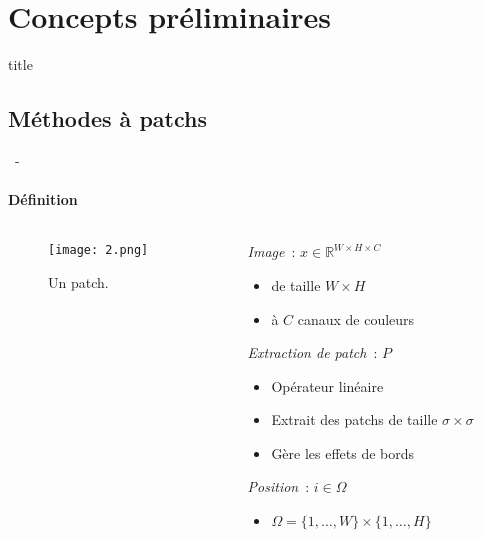 \documentclass[aspectratio=169, 22pt]{beamer}
\begin{document}
\section{Concepts préliminaires}
\begin{frame}
  \begin{beamercolorbox}[sep=15pt,center,shadow=true,rounded=true]{title}
    \LARGE\bfseries \secname
  \end{beamercolorbox}
\end{frame}

\subsection{Méthodes à patchs}
\begin{frame}{\secname~- \subsecname}
  \framesubtitle{Définition}
  \begin{columns}
    \begin{column}{0.45\linewidth}
      \begin{figure}
        \centering
        \texttt{[image: 2.png]}
        \caption{Un patch.}
      \end{figure}
    \end{column}
    
    \begin{column}{0.55\linewidth}
      \emph{Image} : $x \in \mathbb{R}^{W \times H \times C}$
      \begin{itemize}
        \footnotesize 
      \item de taille $W \times H$
      \item à $C$ canaux de couleurs
      \end{itemize}
      
      \vfill
      \emph{Extraction de patch} : $P$
      \begin{itemize}
        \footnotesize 
      \item Opérateur linéaire
      \item Extrait des patchs de taille $\sigma \times \sigma$
      \item Gère les effets de bords
      \end{itemize}

      \vfill
      \emph{Position} : $i \in \Omega$
      \begin{itemize}
        \footnotesize 
      \item $\Omega = \{1,\dots,W\}\times\{1,\dots,H\}$
      \end{itemize}


\end{column}
\end{columns}
\end{frame}
\end{document}
